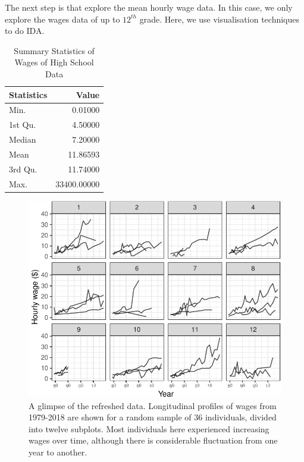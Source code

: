 \documentclass{article}
\begin{document}
The next step is that explore the mean hourly wage data. In this case, we only explore the wages data of up to \(12^{th}\) grade. Here, we use visualisation techniques to do IDA.

\begin{table}

\caption{\label{tab:summarytable}Summary Statistics of Wages of High School Data}
\centering
\begin{tabular}[t]{lr}
\toprule
Statistics & Value\\
\midrule
Min. & 0.01000\\
1st Qu. & 4.50000\\
Median & 7.20000\\
Mean & 11.86593\\
3rd Qu. & 11.74000\\
Max. & 33400.00000\\
\bottomrule
\end{tabular}
\end{table}

\begin{figure}

{\centering \includegraphics[width=1\linewidth]{figures/sample-plot-1} 

}

\caption{A glimpse of the refreshed data. Longitudinal profiles of wages from 1979-2018 are shown for a random sample of 36 individuals, divided into twelve subplots. Most individuals here experienced increasing wages over time, although there is considerable fluctuation from one year to another.}\label{fig:sample-plot}
\end{figure}
\end{document}
